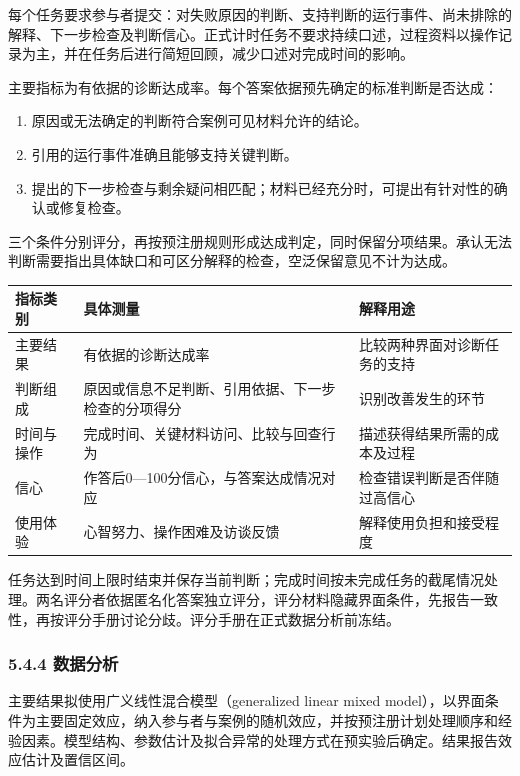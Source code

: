 每个任务要求参与者提交：对失败原因的判断、支持判断的运行事件、尚未排除的解释、下一步检查及判断信心。正式计时任务不要求持续口述，过程资料以操作记录为主，并在任务后进行简短回顾，减少口述对完成时间的影响。

主要指标为有依据的诊断达成率。每个答案依据预先确定的标准判断是否达成：

\begin{enumerate}
  \item 原因或无法确定的判断符合案例可见材料允许的结论。
  \item 引用的运行事件准确且能够支持关键判断。
  \item 提出的下一步检查与剩余疑问相匹配；材料已经充分时，可提出有针对性的确认或修复检查。
\end{enumerate}

三个条件分别评分，再按预注册规则形成达成判定，同时保留分项结果。承认无法判断需要指出具体缺口和可区分解释的检查，空泛保留意见不计为达成。

\begin{table}[H]
  \centering
  \small
  \begin{tabularx}{\textwidth}{Y Y Y}
    \toprule
    指标类别 & 具体测量 & 解释用途 \\
    \midrule
    主要结果 & 有依据的诊断达成率 & 比较两种界面对诊断任务的支持 \\
    判断组成 & 原因或信息不足判断、引用依据、下一步检查的分项得分 & 识别改善发生的环节 \\
    时间与操作 & 完成时间、关键材料访问、比较与回查行为 & 描述获得结果所需的成本及过程 \\
    信心 & 作答后0—100分信心，与答案达成情况对应 & 检查错误判断是否伴随过高信心 \\
    使用体验 & 心智努力、操作困难及访谈反馈 & 解释使用负担和接受程度 \\
    \bottomrule
  \end{tabularx}
\end{table}

任务达到时间上限时结束并保存当前判断；完成时间按未完成任务的截尾情况处理。两名评分者依据匿名化答案独立评分，评分材料隐藏界面条件，先报告一致性，再按评分手册讨论分歧。评分手册在正式数据分析前冻结。

\subsubsection{5.4.4 数据分析}

主要结果拟使用广义线性混合模型（generalized linear mixed model），以界面条件为主要固定效应，纳入参与者与案例的随机效应，并按预注册计划处理顺序和经验因素。模型结构、参数估计及拟合异常的处理方式在预实验后确定。结果报告效应估计及置信区间。

